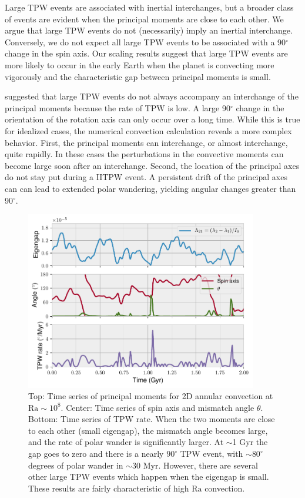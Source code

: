 \documentclass[preprint,12pt,authoryear]{elsarticle}
\begin{document}
Large TPW events are associated with inertial interchanges, but a broader class of events are evident
when the principal moments are close to each other. We argue that large TPW events do not (necessarily) imply an inertial interchange. Conversely, we do not expect all large TPW events to be associated with a 90$^{\circ}$ change in the spin axis. Our scaling results suggest that large TPW events are more likely to occur in the early Earth when the planet is convecting more vigorously and the characteristic gap between principal moments is small.


\citet{tsai2007theoretical} suggested that large TPW events do not always accompany an interchange of the principal moments because the rate of TPW is low. A large 90$^{\circ}$ change in the orientation of the rotation axis can only occur over a long time.  While
this is true for idealized cases, the numerical convection calculation reveals a more complex behavior. 
First, the principal moments can interchange, or almost interchange, quite rapidly. In these cases  the perturbations in the convective moments can become large soon after an interchange.
Second, the location of the principal axes do not stay put during a IITPW event. A persistent drift of the principal axes can can lead to extended polar wandering, yielding angular changes greater than 90$^\circ$.

\begin{figure}
\centering
\includegraphics[width=0.9\textwidth]{figures/misfit.pdf}
  \caption{Top: Time series of principal moments for 2D annular convection at $\mathrm{Ra}\sim10^8$.  Center: Time series of spin axis and mismatch angle $\theta$.  Bottom: Time series of TPW rate. When the two moments are close to each other (small eigengap), the mismatch angle becomes large, and the rate of polar wander is significantly larger. At $\sim$1 Gyr the gap goes to zero and there is a nearly $90^\circ$ TPW event, with $\sim80^\circ$ degrees of polar wander in $\sim$30 Myr. However, there are several other large TPW events which happen when the eigengap is small. These results are fairly characteristic of high $\mathrm{Ra}$ convection.}
\label{fig:misfit}
\end{figure}
\end{document}
